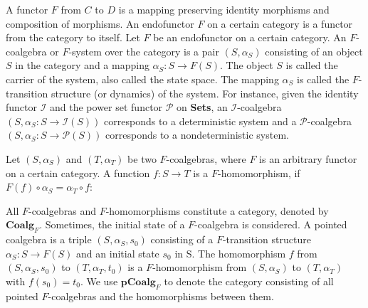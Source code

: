 \documentclass[a4paper, 11pt]{article}
\begin{document}
A functor $F$ from $C$ to $D$ is a mapping preserving identity morphisms and composition of morphisms. An endofunctor $F$ on a certain category is a functor from the category to itself. Let $F$ be an endofunctor on a certain category. An $F$-coalgebra or $F$-system over the category is a pair $(S,\alpha_S)$ consisting of an object $S$ in the category and a mapping $\alpha_S:S\rightarrow F(S)$. The object $S$ is called the carrier of the system,  also called the state space. The mapping $\alpha_S$ is called the $F$-transition structure (or dynamics) of the system. For instance, given the identity functor $\mathcal{I}$ and the power set functor $\mathcal{P}$ on \textbf{Sets}, an $\mathcal{I}$-coalgebra $(S,\alpha_S:S\rightarrow \mathcal{I}(S))$ corresponds to a deterministic system and a $\mathcal{P}$-coalgebra $(S,\alpha_S:S\rightarrow \mathcal{P}(S))$ corresponds to a nondeterministic system.

Let $(S,\alpha_S)$ and $(T,\alpha_T)$ be two $F$-coalgebras, where $F$ is an arbitrary functor on a certain category. A function $f:S\rightarrow T$ is a $F$-homomorphism, if $F(f)\circ \alpha_S=\alpha_T\circ f$:
\begin{center}
\end{center}
All $F$-coalgebras and $F$-homomorphisms constitute a category, denoted by $\textbf{Coalg}_F$. Sometimes, the initial state of a $F$-coalgebra is considered.  A pointed coalgebra is a triple $(S,\alpha_S,s_0)$ consisting of a $F$-transition structure $\alpha_S:S\rightarrow F(S)$ and an initial state $s_0$ in S. The homomorphism $f$ from $(S,\alpha_S,s_0)$ to $(T,\alpha_T,t_0)$ is a $F$-homomorphism from $(S,\alpha_S)$ to $(T,\alpha_T)$ with $f(s_0)=t_0$. We use $\textbf{pCoalg}_F$ to denote the category consisting of all pointed $F$-coalgebras and the homomorphisms between them.
\end{document}
